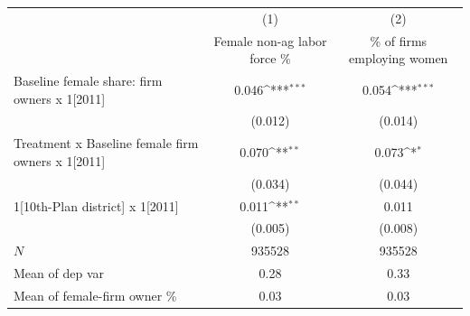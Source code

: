 {
\def\sym#1{\ifmmode^{#1}\else\(^{#1}\)\fi}
\begin{tabular}{l*{2}{c}}
\hline\hline
            &\multicolumn{1}{c}{(1)}         &\multicolumn{1}{c}{(2)}         \\
            &Female non-ag labor force \%         &\% of firms employing women         \\
\hline
Baseline female share: firm owners x 1[2011]&       0.046\sym{***}&       0.054\sym{***}\\
            &     (0.012)         &     (0.014)         \\
[1em]
Treatment x Baseline female firm owners x 1[2011]&       0.070\sym{**} &       0.073\sym{*}  \\
            &     (0.034)         &     (0.044)         \\
[1em]
1[10th-Plan district] x 1[2011]&       0.011\sym{**} &       0.011         \\
            &     (0.005)         &     (0.008)         \\
\hline
\(N\)       &      935528         &      935528         \\
Mean of dep var&        0.28         &        0.33         \\
Mean of female-firm owner \%&        0.03         &        0.03         \\
\hline\hline
\end{tabular}
}
